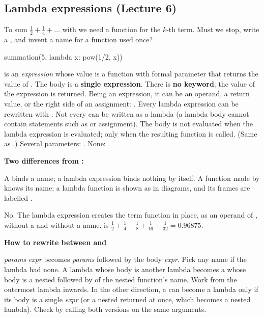 \documentclass[10pt]{scrartcl}
\newenvironment{howto}[1]{\begin{mdframed}[style=howtostyle]{\color{NavyBlue}\textbf{#1}}\par\vspace{2pt}}{\end{mdframed}}
\begin{document}
\subsection{Lambda expressions (Lecture 6)}
\begin{qbox}
  To sum $\frac12+\frac14+\dots$ with  we need a function for the $k$-th term. Must we stop, write a , and invent a name for a function used once?
\end{qbox}
\begin{py}
summation(5, lambda x: pow(1/2, x))
\end{py}
\begin{itemize}
  \ii {} is an \emph{expression} whose value is a function with formal parameter  that returns the value of .
  \ii The body is a \textbf{single expression}. There is \textbf{no  keyword}; the value of the expression is returned.
  \ii Being an expression, it can be an operand, a return value, or the right side of an assignment: .
  \ii Every lambda expression can be rewritten with . Not every  can be written as a lambda (a lambda body cannot contain statements such as  or assignment).
  \ii The body is not evaluated when the lambda expression is evaluated; only when the resulting function is called. (Same as .)
  \ii Several parameters: . None: .
\end{itemize}
\textbf{Two differences from :}
\begin{enumerate}[(1)]
  \ii A  binds a name; a lambda expression binds nothing by itself.
  \ii A function made by  knows its name; a lambda function is shown as  in diagrams, and its frames are labelled .
\end{enumerate}
\revisit No. The lambda expression  creates the term function in place, as an operand of , without a  and without a name.  is $\frac12+\frac14+\frac18+\frac1{16}+\frac1{32} = 0.96875$.

\begin{howto}{How to rewrite between  and }
\begin{steps}
  \ii {} \emph{params}\cd{:} \emph{expr} becomes \emph{params}\cd{):} followed by the body  \emph{expr}. Pick any name if the lambda had none.
  \ii A lambda whose body is another lambda becomes a  whose body is a nested  followed by  of the nested function's name. Work from the outermost lambda inwards.
  \ii In the other direction, a  can become a lambda only if its body is a single  \emph{expr} (or a nested  returned at once, which becomes a nested lambda).
  \ii Check by calling both versions on the same arguments.
\end{steps}
\end{howto}
\end{document}
